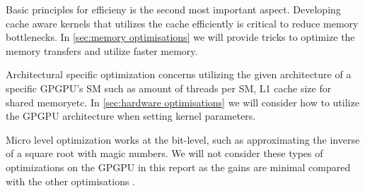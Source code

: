 Basic principles for efficieny is the second most important aspect.
Developing cache aware kernels that utilizes the cache efficiently is critical to reduce memory bottlenecks.
In \cref{sec:memory optimisations} we will provide tricks to optimize the memory transfers and utilize faster memory.

Architectural specific optimization concerns utilizing the given architecture of a specific GPGPU's SM such as amount of threads per SM, L1 cache size for shared memoryetc.
In \cref{sec:hardware optimisations} we will consider how to utilize the GPGPU architecture when setting kernel parameters.

Micro level optimization works at the bit-level, such as approximating the inverse of a square root with magic numbers.
We will not consider these types of optimizations on the GPGPU in this report as the gains are minimal compared with the other optimisations \cite{udacity}.
